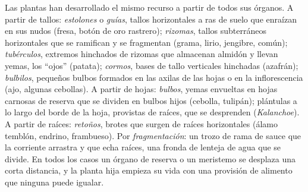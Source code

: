 \begin{proposition}\label{prop:b2:asexual-reproduction:organs}
Las plantas han desarrollado el mismo recurso a partir de todos sus
órganos. A partir de tallos: \emph{estolones} o \emph{guías}, tallos
horizontales a ras de suelo que enraízan en sus nudos (fresa, botón de oro rastrero);
\emph{rizomas}, tallos subterráneos horizontales que se ramifican y se
fragmentan (grama, lirio, jengibre,  común); \emph{tubérculos},
extremos hinchados de rizomas que almacenan almidón y llevan yemas, los
``ojos'' (patata); \emph{cormos}, bases de tallo verticales hinchadas
(azafrán); \emph{bulbilos}, pequeños bulbos formados en las axilas de las
hojas o en la inflorescencia (ajo, algunas cebollas). A partir de hojas:
\emph{bulbos}, yemas envueltas en hojas carnosas de reserva que se
dividen en bulbos hijos (cebolla, tulipán); plántulas a lo largo del
borde de la hoja, provistas de raíces, que se desprenden
(\emph{Kalanchoe}). A partir de raíces: \emph{retoños}, brotes que surgen
de raíces horizontales (álamo temblón, endrino, frambueso). Por
\emph{fragmentación}: un trozo de rama de sauce que la corriente arrastra
y que echa raíces, una fronda de lenteja de agua que se divide. En todos
los casos un órgano de reserva o un meristemo se desplaza una corta
distancia, y la planta hija empieza su vida con una provisión de
alimento que ninguna  puede igualar.
\end{proposition}

